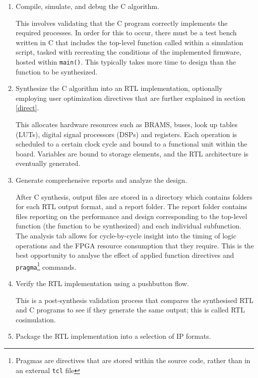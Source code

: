 \documentclass[10pt]{article}
\begin{document}
\begin{enumerate}
	\item Compile, simulate, and debug the C algorithm.
	
	This involves validating that the C program correctly implements the required processes. In order for this to occur, there must be a test bench written in C that includes the top-level function called within a simulation script, tasked with recreating the conditions of the implemented firmware, hosted within \texttt{main()}. This typically takes more time to design than the function to be synthesized.
	
	\item Synthesize the C algorithm into an RTL implementation, optionally employing user optimization directives that are further explained in section \ref{direct}.
	
	This allocates hardware resources such as BRAMS, buses, look up tables (LUTs), digital signal processors (DSPs) and registers. Each operation is scheduled to a certain clock cycle and bound to a functional unit within the board. Variables are bound to storage elements, and the RTL architecture is eventually generated\cite{vahid2010digital}.
	
	\item Generate comprehensive reports and analyze the design.
	
	After C synthesis, output files are stored in a directory which contains folders for each RTL output format, and a report folder. The report folder contains files reporting on the performance and design corresponding to the top-level function (the function to be synthesized) and each individual subfunction. The analysis tab allows for cycle-by-cycle insight into the timing of logic operations and the FPGA resource consumption that they require. This is the best opportunity to analyse the effect of applied function directives and \texttt{pragma}\footnote{Pragmas are directives that are stored within the source code, rather than in an external \texttt{tcl} file} commands.
	
	\item Verify the RTL implementation using a pushbutton flow.
	
	 This is a post-synthesis validation process that compares the synthesised RTL and C programs to see if they generate the same output; this is called RTL cosimulation.
	
	\item Package the RTL implementation into a selection of IP formats.
	

\end{enumerate}
\end{document}
